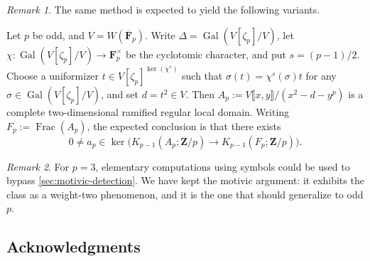 \documentclass[10pt]{amsart}
\newcommand{\Gal}{\operatorname{Gal}}
\DeclareMathOperator{\Frac}{Frac}
\DeclareMathOperator{\Pic}{Pic}
\theoremstyle{remark}
\newtheorem{remark}[remark]{Remark}
\begin{document}
\begin{remark}
\label{rem:odd-prime}
The same method is expected to yield the following variants.

Let $p$ be odd, and $V=W(\overline{\mathbf F}_p)$. Write $\Delta=\Gal(V[\zeta_p]/V)$, let
$\chi\colon\Gal(V[\zeta_p]/V)\to\mathbf F_p^\times$ be the cyclotomic character, and put
$s=(p-1)/2$.  Choose a uniformizer $t\in V[\zeta_p]^{\ker(\chi^s)}$ such that
$\sigma(t)=\chi^s(\sigma)t$ for any $\sigma\in \Gal(V[\zeta_p]/V)$, and set $d=t^2\in V$. Then
\(
 A_p:=V\llbracket x,y\rrbracket/(x^2-d-y^p)
\)
is a complete two-dimensional ramified regular local domain.  Writing
\(F_p:=\Frac(A_p)\), the expected conclusion is that there exists
\[
 0\ne a_p\in\ker\bigl(K_{p-1}(A_p;\mathbf Z/p)
             \longrightarrow K_{p-1}(F_p;\mathbf Z/p)\bigr).
\]

\end{remark}

\begin{remark}\label{rem:elementary}
	For $p=3$, elementary computations using symbols could be used to bypass \cref{sec:motivic-detection}.
	We have kept the
	motivic argument: it exhibits the class as a weight-two phenomenon, and it
	is the one that should generalize to odd $p$.


\end{remark}


\subsection*{Acknowledgments}
\end{document}
